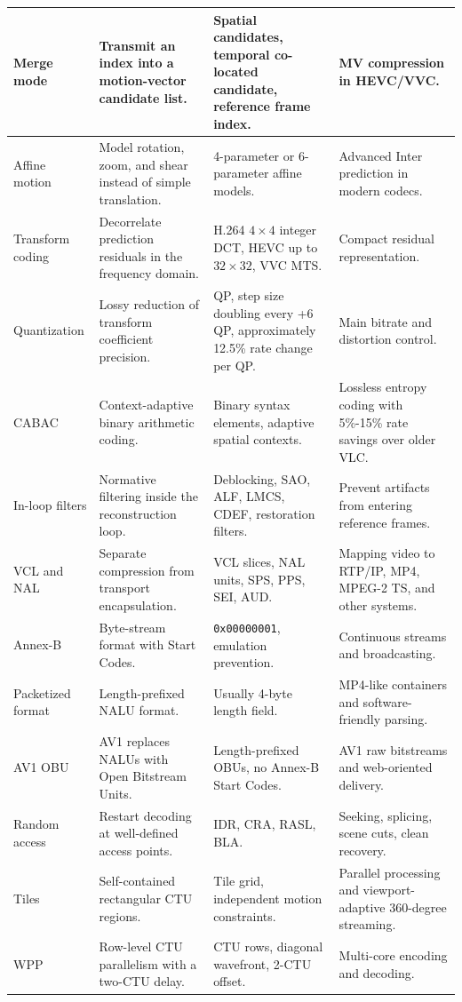 \begin{center}
\begin{tabular}{|l|l|l|l|}
Merge mode & Transmit an index into a motion-vector candidate list. & Spatial candidates, temporal co-located candidate, reference frame index. & MV compression in HEVC/VVC. \\ \hline
Affine motion & Model rotation, zoom, and shear instead of simple translation. & 4-parameter or 6-parameter affine models. & Advanced Inter prediction in modern codecs. \\ \hline
Transform coding & Decorrelate prediction residuals in the frequency domain. & H.264 $4 \times 4$ integer DCT, HEVC up to $32 \times 32$, VVC MTS. & Compact residual representation. \\ \hline
Quantization & Lossy reduction of transform coefficient precision. & QP, step size doubling every +6 QP, approximately 12.5\% rate change per QP. & Main bitrate and distortion control. \\ \hline
CABAC & Context-adaptive binary arithmetic coding. & Binary syntax elements, adaptive spatial contexts. & Lossless entropy coding with 5\%-15\% rate savings over older VLC. \\ \hline
In-loop filters & Normative filtering inside the reconstruction loop. & Deblocking, SAO, ALF, LMCS, CDEF, restoration filters. & Prevent artifacts from entering reference frames. \\ \hline
VCL and NAL & Separate compression from transport encapsulation. & VCL slices, NAL units, SPS, PPS, SEI, AUD. & Mapping video to RTP/IP, MP4, MPEG-2 TS, and other systems. \\ \hline
Annex-B & Byte-stream format with Start Codes. & \texttt{0x00000001}, emulation prevention. & Continuous streams and broadcasting. \\ \hline
Packetized format & Length-prefixed NALU format. & Usually 4-byte length field. & MP4-like containers and software-friendly parsing. \\ \hline
AV1 OBU & AV1 replaces NALUs with Open Bitstream Units. & Length-prefixed OBUs, no Annex-B Start Codes. & AV1 raw bitstreams and web-oriented delivery. \\ \hline
Random access & Restart decoding at well-defined access points. & IDR, CRA, RASL, BLA. & Seeking, splicing, scene cuts, clean recovery. \\ \hline
Tiles & Self-contained rectangular CTU regions. & Tile grid, independent motion constraints. & Parallel processing and viewport-adaptive 360-degree streaming. \\ \hline
WPP & Row-level CTU parallelism with a two-CTU delay. & CTU rows, diagonal wavefront, 2-CTU offset. & Multi-core encoding and decoding. \\ \hline
\end{tabular}
\end{center}


